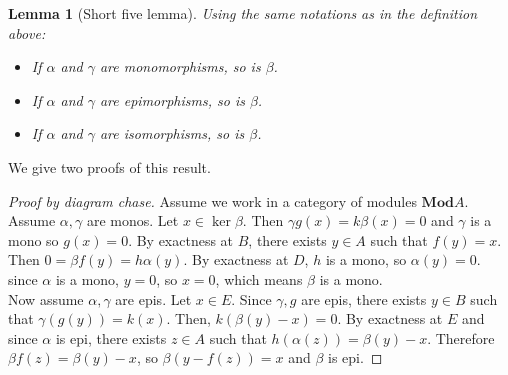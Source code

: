 \documentclass{article}
\newcommand{\Mod}{\mathbf{Mod}}
\theoremstyle{plain}
\newtheorem{lemma}[theorem]{Lemma}
\theoremstyle{definition}
\theoremstyle{remark}
\begin{document}
\begin{lemma}[Short five lemma]
    Using the same notations as in the definition above:
    \begin{itemize}
        \item If $\alpha$ and $\gamma$ are monomorphisms, so is $\beta$.
        \item If $\alpha$ and $\gamma$ are epimorphisms, so is $\beta$.
        \item If $\alpha$ and $\gamma$ are isomorphisms, so is $\beta$.
    \end{itemize}
\end{lemma}
We give two proofs of this result.
\begin{proof}[Proof by diagram chase]
    Assume we work in a category of modules $\Mod A$. Assume $\alpha,\gamma$ are monos. Let $x \in \ker \beta$. Then $\gamma g(x) = k\beta (x)=0$ and $\gamma$ is a mono so $g(x) = 0$. By exactness at $B$, there exists $y \in A$ such that $f(y) = x$. Then $0 = \beta f(y) = h \alpha(y)$. By exactness at $D$, $h$ is a mono, so $\alpha(y) = 0$. since $\alpha$ is a mono, $y = 0$, so $x=0$, which means $\beta$ is a mono. \\
    Now assume $\alpha,\gamma$ are epis. Let $x \in E$. Since $\gamma,g$ are epis, there exists $y \in B$ such that $\gamma(g(y)) = k(x)$. Then, $k(\beta(y)-x) = 0$. By exactness at $E$ and since $\alpha$ is epi, there exists $z \in A$ such that $h(\alpha(z)) = \beta(y) - x$. Therefore $\beta f(z) = \beta(y) - x$, so $\beta(y - f(z)) = x$ and $\beta$ is epi.
\end{proof}
\end{document}
